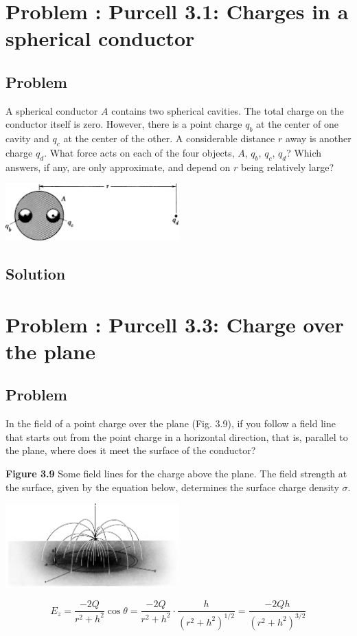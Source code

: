 \documentclass[solutions]{esg8022pset}
\date{\today }
\begin{document}
\section{Problem \thesection: Purcell 3.1: Charges in a spherical conductor}
\subsection{Problem}
  A spherical conductor $A$ contains two spherical cavities. The
  total charge on the conductor itself is zero. However, there is a
  point charge $q_b$ at the center of one cavity and $q_c$ at the
  center of the other.  A considerable distance $r$ away is another
  charge $q_d$. What force acts on each of the four objects, $A$,
  $q_b$, $q_c$, $q_d$? Which answers, if any, are only approximate,
  and depend on $r$ being relatively large?
  \begin{center}\includegraphics[width=0.5\textwidth]{ps04_01}\end{center}
\subsection{Solution}

\section{Problem \thesection: Purcell 3.3: Charge over the plane}
\subsection{Problem}
  In the field of a point charge over the plane (Fig. 3.9), if you
  follow a field line that starts out from the point charge in a
  horizontal direction, that is, parallel to the plane, where does
  it meet the surface of the conductor?

  \textbf{Figure 3.9} Some field lines for the charge above the plane.
  The field strength at the surface, given by the equation below,
  determines the surface charge density $\sigma$.
  \begin{center}\includegraphics[width=0.5\textwidth]{ps04_02}\end{center}
  \begin{equation*}
    E_z = \frac{-2Q}{r^2 + h^2} \cos\theta = \frac{-2Q}{r^2 + h^2}\cdot \frac{h}{(r^2 + h^2)^{1/2}} = \frac{-2Qh}{(r^2 + h^2)^{3/2}}
  \end{equation*}
\end{document}
